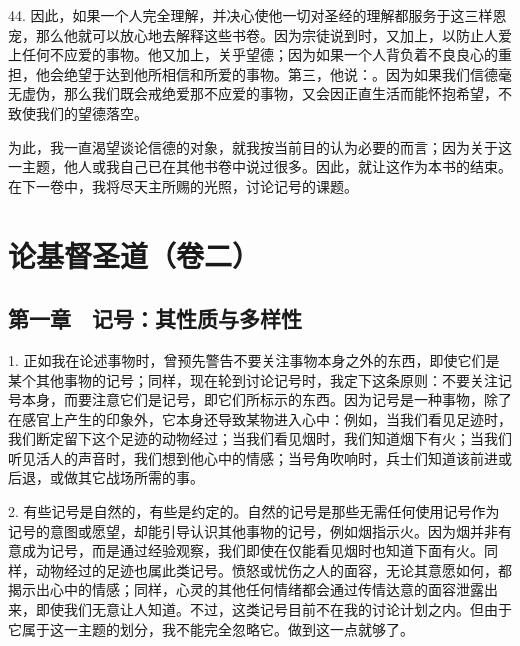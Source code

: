 44. 因此，如果一个人完全理解，并决心使他一切对圣经的理解都服务于这三样恩宠，那么他就可以放心地去解释这些书卷。因为宗徒说到时，又加上，以防止人爱上任何不应爱的事物。他又加上，关乎望德；因为如果一个人背负着不良良心的重担，他会绝望于达到他所相信和所爱的事物。第三，他说：。因为如果我们信德毫无虚伪，那么我们既会戒绝爱那不应爱的事物，又会因正直生活而能怀抱希望，不致使我们的望德落空。\par

为此，我一直渴望谈论信德的对象，就我按当前目的认为必要的而言；因为关于这一主题，他人或我自己已在其他书卷中说过很多。因此，就让这作为本书的结束。在下一卷中，我将尽天主所赐的光照，讨论记号的课题。\par



\section{论基督圣道（卷二）}


\subsection{第一章　记号：其性质与多样性}

1. 正如我在论述事物时，曾预先警告不要关注事物本身之外的东西，即使它们是某个其他事物的记号；同样，现在轮到讨论记号时，我定下这条原则：不要关注记号本身，而要注意它们是记号，即它们所标示的东西。因为记号是一种事物，除了在感官上产生的印象外，它本身还导致某物进入心中：例如，当我们看见足迹时，我们断定留下这个足迹的动物经过；当我们看见烟时，我们知道烟下有火；当我们听见活人的声音时，我们想到他心中的情感；当号角吹响时，兵士们知道该前进或后退，或做其它战场所需的事。\par

2. 有些记号是自然的，有些是约定的。自然的记号是那些无需任何使用记号作为记号的意图或愿望，却能引导认识其他事物的记号，例如烟指示火。因为烟并非有意成为记号，而是通过经验观察，我们即使在仅能看见烟时也知道下面有火。同样，动物经过的足迹也属此类记号。愤怒或忧伤之人的面容，无论其意愿如何，都揭示出心中的情感；同样，心灵的其他任何情绪都会通过传情达意的面容泄露出来，即使我们无意让人知道。不过，这类记号目前不在我的讨论计划之内。但由于它属于这一主题的划分，我不能完全忽略它。做到这一点就够了。\par

